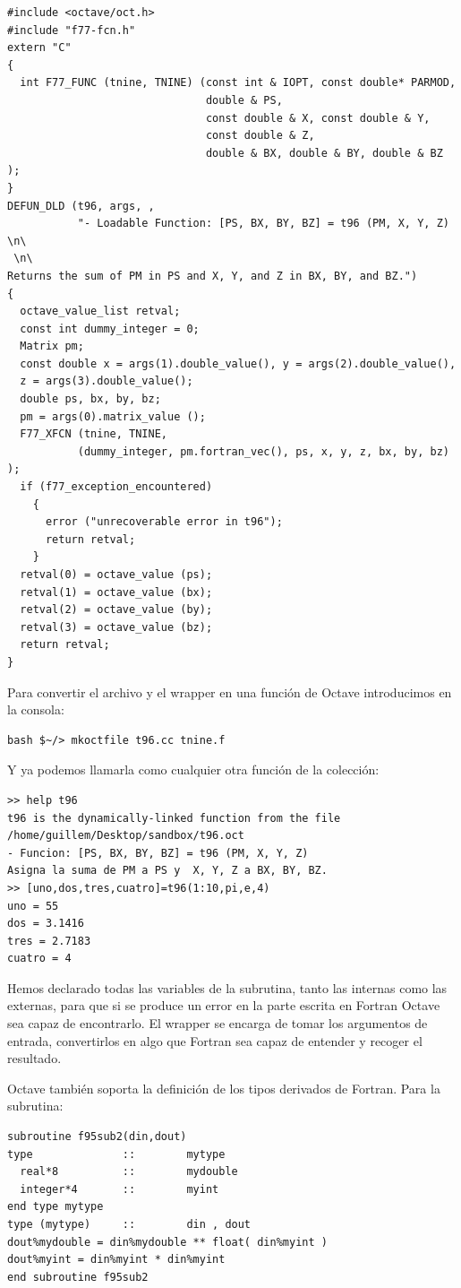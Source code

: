 \begin{verbatim}
#include <octave/oct.h>
#include "f77-fcn.h"
extern "C"
{
  int F77_FUNC (tnine, TNINE) (const int & IOPT, const double* PARMOD,
                               double & PS,
                               const double & X, const double & Y,
                               const double & Z,
                               double & BX, double & BY, double & BZ );
}
DEFUN_DLD (t96, args, ,
           "- Loadable Function: [PS, BX, BY, BZ] = t96 (PM, X, Y, Z) \n\
 \n\
Returns the sum of PM in PS and X, Y, and Z in BX, BY, and BZ.")
{
  octave_value_list retval;
  const int dummy_integer = 0;
  Matrix pm;
  const double x = args(1).double_value(), y = args(2).double_value(),
  z = args(3).double_value();
  double ps, bx, by, bz;
  pm = args(0).matrix_value ();
  F77_XFCN (tnine, TNINE,
           (dummy_integer, pm.fortran_vec(), ps, x, y, z, bx, by, bz) );
  if (f77_exception_encountered)
    {
      error ("unrecoverable error in t96");
      return retval;
    }
  retval(0) = octave_value (ps);
  retval(1) = octave_value (bx);
  retval(2) = octave_value (by);
  retval(3) = octave_value (bz);
  return retval;
}
\end{verbatim}
Para convertir el archivo y el wrapper en una función de Octave
introducimos en la consola:

\begin{verbatim}
bash $~/> mkoctfile t96.cc tnine.f
\end{verbatim}
Y ya podemos llamarla como cualquier otra función de la colección:

\begin{verbatim}
>> help t96
t96 is the dynamically-linked function from the file
/home/guillem/Desktop/sandbox/t96.oct
- Funcion: [PS, BX, BY, BZ] = t96 (PM, X, Y, Z)
Asigna la suma de PM a PS y  X, Y, Z a BX, BY, BZ.
>> [uno,dos,tres,cuatro]=t96(1:10,pi,e,4)
uno = 55
dos = 3.1416
tres = 2.7183
cuatro = 4
\end{verbatim}

Hemos declarado todas las variables de la subrutina, tanto las
internas como las externas, para que si se produce un error en la
parte escrita en Fortran Octave sea capaz de encontrarlo. El wrapper
se encarga de tomar los argumentos de entrada, convertirlos en algo
que Fortran sea capaz de entender y recoger el resultado.

Octave también soporta la definición de los tipos derivados de
Fortran.  Para la subrutina:

\begin{verbatim}
subroutine f95sub2(din,dout)
type              ::        mytype
  real*8          ::        mydouble
  integer*4       ::        myint
end type mytype
type (mytype)     ::        din , dout
dout%mydouble = din%mydouble ** float( din%myint )
dout%myint = din%myint * din%myint
end subroutine f95sub2
\end{verbatim}

